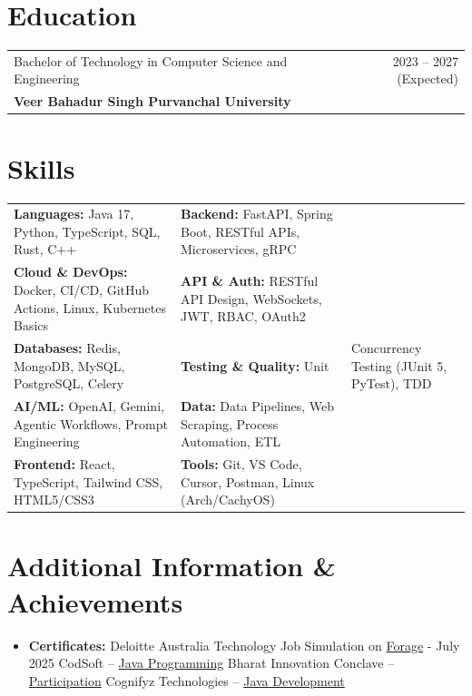 \documentclass[a4paper,10pt]{article}
\begin{document}
\section{Education}
\begin{tabularx}{\linewidth}{ @{}l r@{} }
Bachelor of Technology in Computer Science and Engineering & \hfill 2023 -- 2027 (Expected) \\[2pt]
\textbf{Veer Bahadur Singh Purvanchal University} &
\end{tabularx}

\section{Skills}
\begin{tabularx}{\linewidth}{@{}X X@{}}
\textbf{Languages:} Java 17, Python, TypeScript, SQL, Rust, C++ & \textbf{Backend:} FastAPI, Spring Boot, RESTful APIs, Microservices, gRPC \\[2pt]
\textbf{Cloud \& DevOps:} Docker, CI/CD, GitHub Actions, Linux, Kubernetes Basics & \textbf{API \& Auth:} RESTful API Design, WebSockets, JWT, RBAC, OAuth2 \\[2pt]
\textbf{Databases:} Redis, MongoDB, MySQL, PostgreSQL, Celery & \textbf{Testing \& Quality:} Unit & Concurrency Testing (JUnit 5, PyTest), TDD \\[2pt]
\textbf{AI/ML:} OpenAI, Gemini, Agentic Workflows, Prompt Engineering & \textbf{Data:} Data Pipelines, Web Scraping, Process Automation, ETL \\[2pt]
\textbf{Frontend:} React, TypeScript, Tailwind CSS, HTML5/CSS3 & \textbf{Tools:} Git, VS Code, Cursor, Postman, Linux (Arch/CachyOS)
\end{tabularx}

\section{Additional Information \& Achievements}
\begin{itemize}[nosep,after=\strut, leftmargin=1em, itemsep=0pt,label=--]
\item \textbf{Certificates:} Deloitte Australia Technology Job Simulation on \href{https://drive.google.com/file/d/1dP-lXbwKe-u69BI3Z1gX4FDZZyn8Cr5n/view}{Forage} - July 2025 \textbar{} CodSoft -- \href{https://drive.google.com/file/d/1TeMMQSghHzaITFT6s5T-Z1C5Xvn22QMs/view}{Java Programming} \textbar{} Bharat Innovation Conclave -- \href{https://drive.google.com/file/d/11uL40HfYTX029SwxAb8JDQUY9_X5_uaO/view?usp=drive_link}{Participation} \textbar{} Cognifyz Technologies -- \href{https://drive.google.com/file/d/1eQty7zGGwGZ_mdupwpvc1sC22R4D-R7X/view}{Java Development}
\end{itemize}
\end{document}

